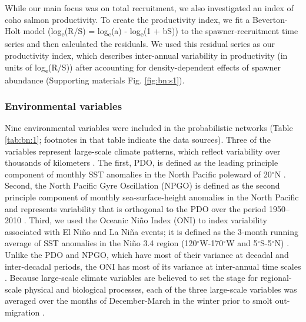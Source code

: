 While our main focus was on total recruitment, we also investigated an index of
coho salmon productivity. To create the productivity index, we fit a
Beverton-Holt model (log\textsubscript{e}(R/S) = log\textsubscript{e}(a) -
log\textsubscript{e}(1 + bS)) \citep{Beverton1957a} to the spawner-recruitment
time series and then calculated the residuals. We used this residual series as
our productivity index, which describes inter-annual variability in productivity
(in units of log\textsubscript{e}(R/S)) after accounting for density-dependent
effects of spawner abundance (Supporting materials Fig. \ref{fig:bn:s1}).


\subsubsection{Environmental variables}

Nine environmental variables were included in the probabilistic networks (Table
\ref{tab:bn:1}; footnotes in that table indicate the data sources). Three of the
variables represent large-scale climate patterns, which reflect variability over
thousands of kilometers \citep{King2011}. The first, PDO, is defined as the
leading principle component of monthly SST anomalies in the North Pacific
poleward of 20$^{\circ}$N \citep{Mantua1997a}.  Second, the North Pacific Gyre
Oscillation (NPGO) is defined as the second principle component of monthly
sea-surface-height anomalies in the North Pacific and represents variability
that is orthogonal to the PDO over the period 1950--2010
\citep{Di-Lorenzo2008a}. Third, we used the Oceanic Ni\~{n}o Index (ONI) to
index variability associated with El Ni\~{n}o and La Ni\~{n}a events; it is
defined as the 3-month running average of SST anomalies in the Ni\~{n}o 3.4
region (120$^{\circ}$W-170$^{\circ}$W and 5$^{\circ}$S-5$^{\circ}$N)
\citep{Trenberth1997}. Unlike the PDO and NPGO, which have most of their
variance at decadal and inter-decadal periods, the ONI has most of its variance
at inter-annual time scales \citep{Sarachik2010a}. Because large-scale climate
variables are believed to set the stage for regional-scale physical and
biological processes, each of the three large-scale variables was averaged over
the months of December-March in the winter prior to smolt out-migration
\citep{Mantua1997a, Yeh2011, DiLorenzo2013a}.

